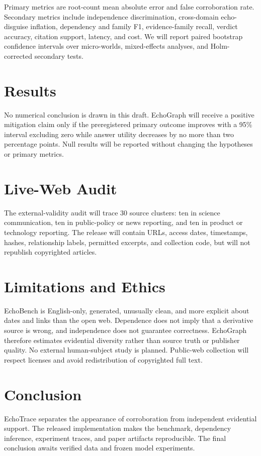 \documentclass[11pt]{article}
\begin{document}
Primary metrics are root-count mean absolute error and false corroboration rate. Secondary metrics
include independence discrimination, cross-domain echo-disguise inflation, dependency and family F1, evidence-family
recall, verdict accuracy, citation support, latency, and cost. We will report paired bootstrap
confidence intervals over micro-worlds, mixed-effects analyses, and Holm-corrected secondary tests.

\section{Results}


No numerical conclusion is drawn in this draft. EchoGraph will receive a positive mitigation claim
only if the preregistered primary outcome improves with a 95\% interval excluding zero while answer
utility decreases by no more than two percentage points. Null results will be reported without
changing the hypotheses or primary metrics.

\section{Live-Web Audit}
The external-validity audit will trace 30 source clusters: ten in science communication, ten in
public-policy or news reporting, and ten in product or technology reporting. The release will contain
URLs, access dates, timestamps, hashes, relationship labels, permitted excerpts, and collection code,
but will not republish copyrighted articles.

\section{Limitations and Ethics}
EchoBench is English-only, generated, unusually clean, and more explicit about dates and links than
the open web. Dependence does not imply that a derivative source is wrong, and independence does not
guarantee correctness. EchoGraph therefore estimates evidential diversity rather than source truth or
publisher quality. No external human-subject study is planned. Public-web collection will respect
licenses and avoid redistribution of copyrighted full text.

\section{Conclusion}
EchoTrace separates the appearance of corroboration from independent evidential support. The
released implementation makes the benchmark, dependency inference, experiment traces, and paper
artifacts reproducible. The final conclusion awaits verified data and frozen model experiments.


\end{document}
